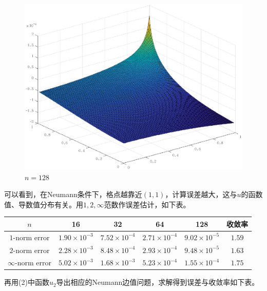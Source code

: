 \documentclass[lang=cn,11pt,a4paper]{elegantpaper}
\begin{document}
\begin{figure}[htbp]
\begin{minipage}[t]{0.24\linewidth}
    \caption*{$n=64$}
  \end{minipage}
  \begin{minipage}[t]{0.24\linewidth}
    \centering
    \includegraphics[width=0.95\linewidth]{figure/error_problem1_N_r_n=128.eps}
    \caption*{$n=128$}
  \end{minipage}
\end{figure}

可以看到，在Neumann条件下，格点越靠近$(1,1)$，计算误差越大，这与$u$的函数值、导数值分布有关。用$1,2,\infty$范数作误差估计，如下表。

\begin{table}[H]
  \centering
  \begin{tabular}{c|cccc|c}
  \textbf{$n$}        & 16                   & 32                   & 64                   & 128                  & 收敛率 \\ \hline
  $1$-norm error      & $1.90\times 10^{-3}$ & $7.52\times 10^{-4}$ & $2.71\times 10^{-4}$ & $9.02\times 10^{-5}$ & $1.59$\\
  $2$-norm error      & $2.28\times 10^{-3}$ & $8.48\times 10^{-4}$ & $2.93\times 10^{-4}$ & $9.48\times 10^{-5}$ & $1.63$\\
  $\infty$-norm error & $5.02\times 10^{-3}$ & $1.68\times 10^{-3}$ & $5.23\times 10^{-4}$ & $1.55\times 10^{-4}$ & $1.75$
  \end{tabular}
\end{table}

再用(2)中函数$u_2$导出相应的Neumann边值问题，求解得到误差与收敛率如下表。
\end{document}
